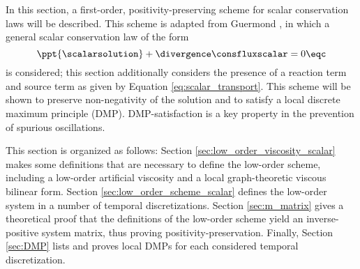 In this section, a first-order, positivity-preserving scheme for
scalar conservation laws will be described. This scheme is adapted from
Guermond \cite{guermond_firstorder}, in which a general scalar conservation
law of the form
\begin{equation}
  \ppt{\scalarsolution} + \divergence\consfluxscalar = 0 \eqc
\end{equation}
is considered; this section additionally considers the presence of a
reaction term and source term as given by Equation \eqref{eq:scalar_transport}.
This scheme will be shown to preserve non-negativity of the solution and
to satisfy a local discrete maximum principle (DMP). DMP-satisfaction
is a key property in the prevention of spurious oscillations.

This section is organized as follows: Section \ref{sec:low_order_viscosity_scalar}
makes some definitions that are necessary to define the low-order scheme, including
a low-order artificial viscosity and a local graph-theoretic viscous bilinear form.
Section \ref{sec:low_order_scheme_scalar} defines the low-order system in a number
of temporal discretizations. Section \ref{sec:m_matrix} gives a theoretical proof that the
definitions of the low-order scheme yield an inverse-positive system matrix,
thus proving positivity-preservation. Finally, Section \ref{sec:DMP} lists and
proves local DMPs for each considered temporal discretization.

